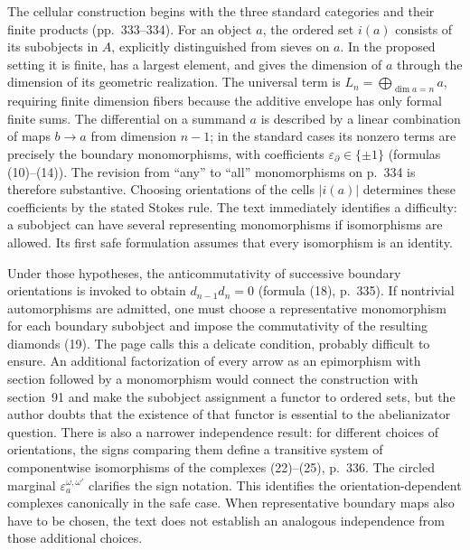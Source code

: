 The cellular construction begins with the three standard categories and their finite products (pp.~333--334). For an object $a$, the ordered set $i(a)$ consists of its subobjects in $A$, explicitly distinguished from sieves on $a$. In the proposed setting it is finite, has a largest element, and gives the dimension of $a$ through the dimension of its geometric realization. The universal term is $L_n=\bigoplus_{\dim a=n}a$, requiring finite dimension fibers because the additive envelope has only formal finite sums. The differential on a summand $a$ is described by a linear combination of maps $b\to a$ from dimension $n-1$; in the standard cases its nonzero terms are precisely the boundary monomorphisms, with coefficients $\varepsilon_{\partial}\in\{\pm1\}$ (formulas (10)--(14)). The revision from ``any'' to ``all'' monomorphisms on p.~334 is therefore substantive. Choosing orientations of the cells $|i(a)|$ determines these coefficients by the stated Stokes rule. The text immediately identifies a difficulty: a subobject can have several representing monomorphisms if isomorphisms are allowed. Its first safe formulation assumes that every isomorphism is an identity.

Under those hypotheses, the anticommutativity of successive boundary orientations is invoked to obtain $d_{n-1}d_n=0$ (formula (18), p.~335). If nontrivial automorphisms are admitted, one must choose a representative monomorphism for each boundary subobject and impose the commutativity of the resulting diamonds (19). The page calls this a delicate condition, probably difficult to ensure. An additional factorization of every arrow as an epimorphism with section followed by a monomorphism would connect the construction with section~91 and make the subobject assignment a functor to ordered sets, but the author doubts that the existence of that functor is essential to the abelianizator question. There is also a narrower independence result: for different choices of orientations, the signs comparing them define a transitive system of componentwise isomorphisms of the complexes (22)--(25), p.~336. The circled marginal $\varepsilon_a^{\omega,\omega'}$ clarifies the sign notation. This identifies the orientation-dependent complexes canonically in the safe case. When representative boundary maps also have to be chosen, the text does not establish an analogous independence from those additional choices.

